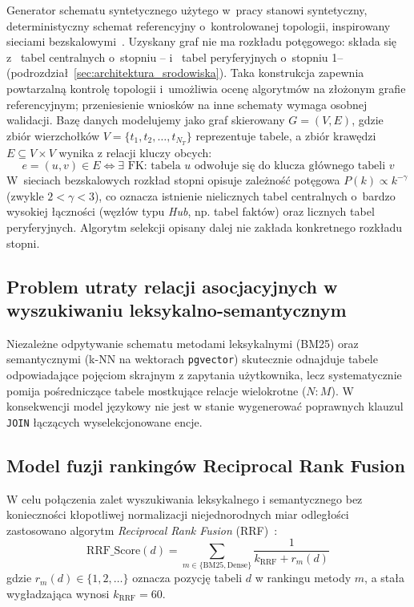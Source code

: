 Generator schematu syntetycznego użytego w~pracy stanowi syntetyczny, deterministyczny schemat referencyjny o~kontrolowanej topologii, inspirowany sieciami bezskalowymi~\cite{barabasi1999}. Uzyskany graf nie ma rozkładu potęgowego: składa się z~\wynOsixHubs{} tabel centralnych o~stopniu \wynOsixHubMin--\wynOsixHubMax{} i~\wynOsixPeriph{} tabel peryferyjnych o~stopniu 1--\wynOsixPeriphMax{} (podrozdział~\ref{sec:architektura_srodowiska}). Taka konstrukcja zapewnia powtarzalną kontrolę topologii i~umożliwia ocenę algorytmów na złożonym grafie referencyjnym; przeniesienie wniosków na inne schematy wymaga osobnej walidacji. Bazę danych modelujemy jako graf skierowany $G = (V, E)$, gdzie zbiór wierzchołków $V = \{t_1, t_2, \dots, t_{N_T}\}$ reprezentuje tabele, a zbiór krawędzi $E \subseteq V \times V$ wynika z relacji kluczy obcych:
\begin{equation}
e = (u, v) \in E \iff \exists \text{ FK: tabela } u \text{ odwołuje się do klucza głównego tabeli } v
\label{eq:fk_edge_definition}
\end{equation}
W~sieciach bezskalowych rozkład stopni opisuje zależność potęgowa $P(k) \propto k^{-\gamma}$ (zwykle $2 < \gamma < 3$), co oznacza istnienie nielicznych tabel centralnych o~bardzo wysokiej łączności (węzłów typu \emph{Hub}, np. tabel faktów) oraz licznych tabel peryferyjnych. Algorytm selekcji opisany dalej nie zakłada konkretnego rozkładu stopni.

\subsection{Problem utraty relacji asocjacyjnych w wyszukiwaniu leksykalno-semantycznym}
\label{subsec:projekt_ograniczenia_wyszukiwania}

Niezależne odpytywanie schematu metodami leksykalnymi (BM25) oraz semantycznymi (k-NN na wektorach \texttt{pgvector}) skutecznie odnajduje tabele odpowiadające pojęciom skrajnym z zapytania użytkownika, lecz systematycznie pomija pośredniczące tabele mostkujące relacje wielokrotne ($N:M$). W konsekwencji model językowy nie jest w stanie wygenerować poprawnych klauzul \texttt{JOIN} łączących wyselekcjonowane encje.

\subsection{Model fuzji rankingów Reciprocal Rank Fusion}
\label{subsec:projekt_rrf_model}

W celu połączenia zalet wyszukiwania leksykalnego i semantycznego bez konieczności kłopotliwej normalizacji niejednorodnych miar odległości zastosowano algorytm \emph{Reciprocal Rank Fusion} (RRF)~\cite{cormack2009rrf}:
\begin{equation}
\text{RRF\_Score}(d) = \sum_{m \in \{\text{BM25}, \text{Dense}\}} \frac{1}{k_{\text{RRF}} + r_m(d)}
\label{eq:rrf_formal}
\end{equation}
gdzie $r_m(d) \in \{1, 2, \dots\}$ oznacza pozycję tabeli $d$ w rankingu metody $m$, a stała wygładzająca wynosi $k_{\text{RRF}} = 60$.

